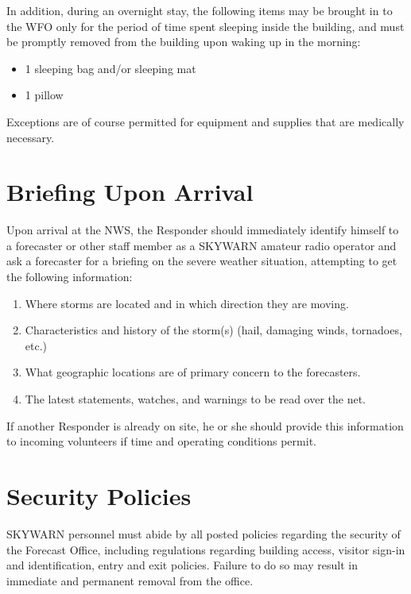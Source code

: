 \documentclass[pdflatex,letterpaper,twoside,12pt]{book}
\begin{document}
In addition, during an overnight stay, the following items may be brought in to the WFO only for the period of time spent sleeping inside the building, and must be promptly removed from the building upon waking up in the morning:
\begin{itemize}
\item 1 sleeping bag and/or sleeping mat
\item 1 pillow
\end{itemize}

Exceptions are of course permitted for equipment and supplies that are medically necessary.


\section{Briefing Upon Arrival}

Upon arrival at the NWS, the Responder should immediately identify himself to a forecaster or other staff member as a SKYWARN amateur radio operator and ask a forecaster for a briefing on the severe weather situation, attempting to get the following information:

\begin{enumerate}
\item Where storms are located and in which direction they are moving. 
\item Characteristics and history of the storm(s) (hail, damaging winds, tornadoes, etc.) 
\item What geographic locations are of primary concern to the forecasters. 
\item The latest statements, watches, and warnings to be read over the net.
\end{enumerate}

If another Responder is already on site, he or she should provide this information to incoming volunteers if time and operating conditions permit.


\section{Security Policies}
SKYWARN personnel must abide by all posted policies regarding the security of the Forecast Office, including regulations regarding building access, visitor sign-in and identification, entry and exit policies.  Failure to do so may result in immediate and permanent removal from the office.
\end{document}
